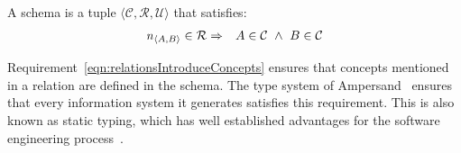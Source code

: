 \documentclass[runningheads]{llncs}
\newcommand{\id}[1]{\text{\it #1\/}}
\newcommand{\instance}{\mathbin{\id{inst}}}
\newcommand{\sat}[2]{\id{sat}_{#1}(#2)}
\newcommand{\viol}[2]{\violC{#1}(#2)}
\newcommand{\violC}[1]{\id{viol}_{#1}}
\newcommand{\sign}[1]{\id{sign}(#1)}
\newcommand{\powerset}[1]{\cal{P}\{#1\}}
\newcommand{\declare}[3]{\id{#1}_{\pair{#2}{#3}}}
\newcommand{\pair}[2]{\langle{#1},{#2}\rangle}
\newcommand{\Pair}[2]{#1\times#2}
\newcommand{\triple}[3]{\langle{#1},{#2},{#3}\rangle}
\newcommand{\Atoms}{\mathbb{A}}
\newcommand{\concepts}{\mathcal{C}}
\newcommand{\Concepts}{\mathbb{C}}
\newcommand{\rels}{\mathcal{R}}   %
\newcommand{\rules}{\mathcal{U}}
\newcommand{\Rules}{\mathbb{U}}
\newcommand{\dataset}{\mathscr{D}}
\newcommand{\Dataset}{\mathbb{D}}
\begin{document}
   \begin{definition}[Schema]
   A schema is a tuple $\triple{\concepts}{\rels}{\rules}$ that satisfies:
\begin{eqnarray}
   \declare{n}{A}{B}\in\rels&\Rightarrow&A\in\concepts\ \wedge\ B\in\concepts
   \label{eqn:relationsIntroduceConcepts}
\end{eqnarray}
   \end{definition}
   Requirement~\ref{eqn:relationsIntroduceConcepts} ensures that concepts mentioned in a relation are defined in the schema.
   The type system of Ampersand~\cite{vdWoude2011} ensures that every information system it generates satisfies this requirement.
   This is also known as static typing, which has well established advantages for the software engineering process~\cite{HanenbergKRTS14,Petersen2014}.
   


   
\end{document}
